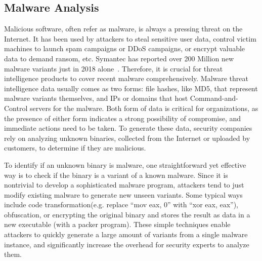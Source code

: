 \subsection{Malware Analysis}
Malicious software, often refer as malware, is always a pressing threat 
on the Internet. It has been used by attackers to steal sensitive user data, 
control victim machines to launch spam campaigns or DDoS campaigns, or 
encrypt valuable data to demand ransom, etc. Symantec has reported over 200 
Million new malware variants just in 2018 alone~\cite{symantecmalware}. 
Therefore, it is crucial for threat intelligence products to cover recent 
malware comprehensively.
Malware threat intelligence data usually comes as two forms: file hashes,
like MD5, that represent malware variants themselves, and IPs or domains
that host Command-and-Control servers for the malware. Both form of 
data is critical for organizations, as the presence of either form 
indicates a strong possibility of compromise, and immediate actions need 
to be taken. To generate these data, security companies rely on analyzing 
unknown binaries, collected from the Internet or uploaded by customers,
to determine if they are malicious.

To identify if an unknown binary is malware, one straightforward yet
effective way is to check if the binary is a variant of a known malware.
Since it is nontrivial to develop a sophisticated malware program, 
attackers tend to just modify existing malware to generate new unseen
variants. Some typical ways include code transformation(e.g. replace ``mov 
eax, 0'' with ``xor eax, eax''), obfuscation, or encrypting the original 
binary and stores the result as data in a new executable (with a packer 
program). These simple techniques enable attackers to quickly generate a 
large amount of variants from a single malware instance, and significantly 
increase the overhead for security experts to analyze them.

